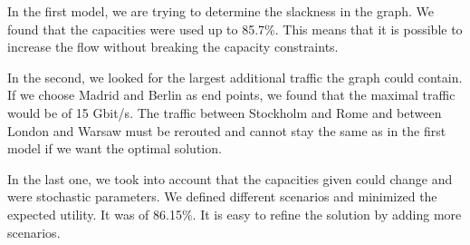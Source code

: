 \documentclass[11pt,a4paper]{article}
\begin{document}
In the first model, we are trying to determine the slackness in the graph. We found that the capacities were used up to 85.7\%. This means that it is possible to increase the flow without breaking the capacity constraints.

In the second, we looked for the largest additional traffic the graph could contain. If we choose Madrid and Berlin as end points, we found that the maximal traffic would be of 15 Gbit/s. The traffic between Stockholm and Rome and between London and Warsaw must be rerouted and cannot stay the same as in the first model if we want the optimal solution.

In the last one, we took into account that the capacities given could change and were stochastic parameters. We defined different scenarios and minimized the expected utility. It was of 86.15\%. It is easy to refine the solution by adding more scenarios.
\end{document}
